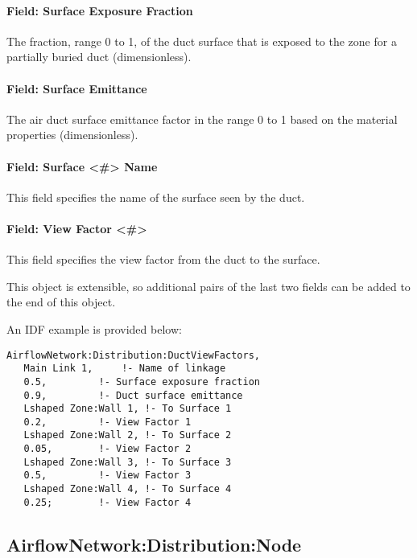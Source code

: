 \paragraph{Field: Surface Exposure Fraction}\label{field-surface-exposure-fraction}
The fraction, range 0 to 1, of the duct surface that is exposed to the zone for a partially buried duct (dimensionless).

\paragraph{Field: Surface Emittance}\label{field-surface-emittance}
The air duct surface emittance factor in the range 0 to 1 based on the material properties (dimensionless).

\paragraph{Field: Surface \textless{}\#\textgreater{} Name}\label{field-surface-1-name}
This field specifies the name of the surface seen by the duct.

\paragraph{Field: View Factor \textless{}\#\textgreater{}}\label{field-surface-1-view-factor}
This field specifies the view factor from the duct to the surface.

This object is extensible, so additional pairs of the last two fields can be added to the end of this object.

An IDF example is provided below:

\begin{lstlisting}
AirflowNetwork:Distribution:DuctViewFactors,
   Main Link 1,		!- Name of linkage
   0.5,			!- Surface exposure fraction
   0.9,			!- Duct surface emittance
   Lshaped Zone:Wall 1,	!- To Surface 1
   0.2,			!- View Factor 1
   Lshaped Zone:Wall 2,	!- To Surface 2
   0.05,		!- View Factor 2
   Lshaped Zone:Wall 3,	!- To Surface 3
   0.5,			!- View Factor 3
   Lshaped Zone:Wall 4,	!- To Surface 4
   0.25;		!- View Factor 4
\end{lstlisting}

\subsection{AirflowNetwork:Distribution:Node}\label{airflownetworkdistributionnode}

